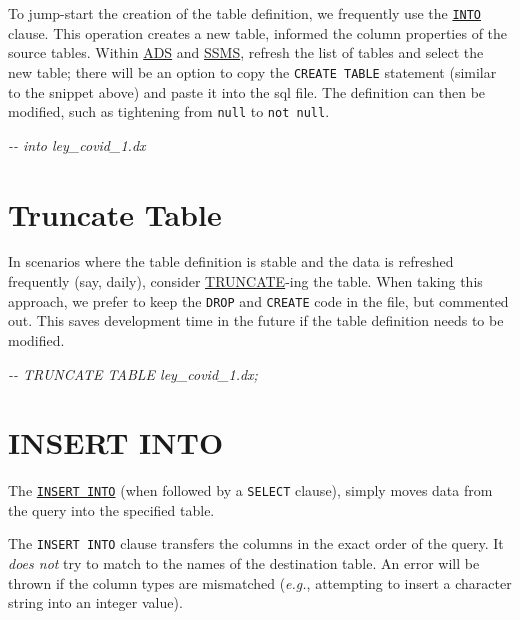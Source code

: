 \documentclass[
]{book}
\newenvironment{Shaded}{\begin{snugshade}}{\end{snugshade}}
\newcommand{\CommentTok}[1]{\textcolor[rgb]{0.56,0.35,0.01}{\textit{#1}}}
\begin{document}
To jump-start the creation of the table definition, we frequently use the \href{https://docs.microsoft.com/en-us/sql/t-sql/queries/select-into-clause-transact-sql}{\texttt{INTO}} clause. This operation creates a new table, informed the column properties of the source tables. Within \protect\hyperlink{workstation-ads}{ADS} and \protect\hyperlink{workstation-ssms}{SSMS}, refresh the list of tables and select the new table; there will be an option to copy the \texttt{CREATE\ TABLE} statement (similar to the snippet above) and paste it into the sql file. The definition can then be modified, such as tightening from \texttt{null} to \texttt{not\ null}.

\begin{Shaded}
\begin{Highlighting}[]
  \CommentTok{{-}{-} into ley\_covid\_1.dx}
\end{Highlighting}
\end{Shaded}

\hypertarget{sql-truncate}{%
\section{Truncate Table}\label{sql-truncate}}

In scenarios where the table definition is stable and the data is refreshed frequently (say, daily), consider \href{https://docs.microsoft.com/en-us/sql/t-sql/statements/truncate-table-transact-sql}{TRUNCATE}-ing the table. When taking this approach, we prefer to keep the \texttt{DROP} and \texttt{CREATE} code in the file, but commented out. This saves development time in the future if the table definition needs to be modified.

\begin{Shaded}
\begin{Highlighting}[]
\CommentTok{{-}{-} TRUNCATE TABLE ley\_covid\_1.dx;}
\end{Highlighting}
\end{Shaded}

\hypertarget{sql-insert}{%
\section{INSERT INTO}\label{sql-insert}}

The \href{https://www.w3schools.com/sql/sql_insert_into_select.asp}{\texttt{INSERT\ INTO}} (when followed by a \texttt{SELECT} clause), simply moves data from the query into the specified table.

The \texttt{INSERT\ INTO} clause transfers the columns in the exact order of the query. It \emph{does not} try to match to the names of the destination table. An error will be thrown if the column types are mismatched (\emph{e.g.}, attempting to insert a character string into an integer value).
\end{document}

